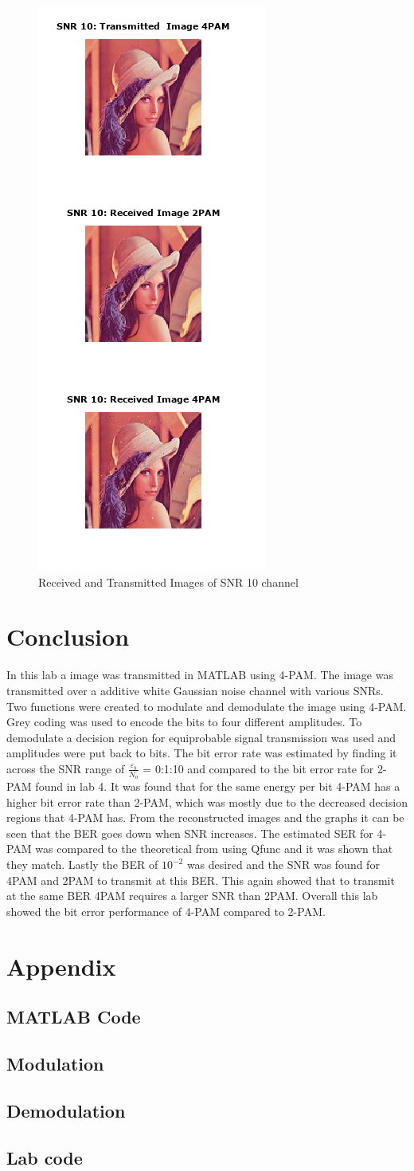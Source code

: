 \documentclass{article}
\begin{document}
\newpage
\begin{figure}
        \centering 	\includegraphics[width=.2\linewidth]{lena10.PNG}
    \caption{Received and Transmitted Images of SNR 10 channel}
\end{figure}
\clearpage
\section{Conclusion}
In this lab a image was transmitted in MATLAB using 4-PAM. The image was transmitted over a additive white Gaussian noise channel with various SNRs. Two functions were created to modulate and demodulate the image using 4-PAM. Grey coding was used to encode the bits to four different amplitudes. To demodulate a decision region for equiprobable signal transmission was used and amplitudes were put back to bits. The bit error rate was estimated by finding it across the SNR  range of $\frac{\varepsilon_b}{N_o}$ = 0:1:10 and compared to the bit error rate for 2-PAM found in lab 4. It was found that for the same energy per bit 4-PAM has a higher bit error rate than 2-PAM, which was mostly due to the decreased decision regions that 4-PAM has. From the reconstructed images and the graphs it can be seen that the BER goes down when SNR increases. The estimated SER for 4-PAM was compared to the theoretical from using Qfunc and it was shown that they match. Lastly the BER of $10^{-2}$ was desired and the SNR was found for 4PAM and 2PAM to transmit at this BER. This again showed that to transmit at the same BER 4PAM requires a larger SNR than 2PAM. Overall this lab showed the bit error performance of 4-PAM compared to 2-PAM. 
\newpage

\section{Appendix}
\subsection{MATLAB Code}
\subsection{Modulation}

\subsection{Demodulation}

\subsection{Lab code}

\end{document}
